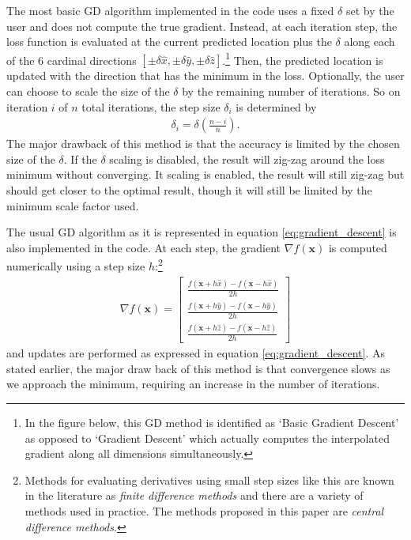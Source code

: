 \documentclass[11pt, letterpaper]{extarticle} %
\begin{document}
The most basic GD algorithm implemented in the code uses a fixed $\delta$ set by the user and does not compute the true gradient. Instead, at each iteration step, the loss function is evaluated at the current predicted location plus the $\delta$ along each of the 6 cardinal directions $[\pm \delta \hat{x}, \pm \delta \hat{y}, \pm \delta \hat{z}]$.\footnote{In the figure below, this GD method is identified as `Basic Gradient Descent' as opposed to `Gradient Descent' which actually computes the interpolated gradient along all dimensions simultaneously.} Then, the predicted location is updated with the direction that has the minimum in the loss. Optionally, the user can choose to scale the size of the $\delta$ by the remaining number of iterations. So on iteration $i$ of $n$ total iterations, the step size $\delta_i$ is determined by
\begin{align}
    \delta_i = \delta \left(\frac{n-i}{n} \right).    
\end{align}
The major drawback of this method is that the accuracy is limited by the chosen size of the $\delta$. If the $\delta$ scaling is disabled, the result will zig-zag around the loss minimum without converging. It scaling is enabled, the result will still zig-zag but should get closer to the optimal result, though it will still be limited by the minimum scale factor used.

The usual GD algorithm as it is represented in equation \ref{eq:gradient_descent} is also implemented in the code. At each step, the gradient $\nabla f (\mathbf{x})$ is computed numerically using a step size $h$:\footnote{Methods for evaluating derivatives using small step sizes like this are known in the literature as \textit{finite difference methods} and there are a variety of methods used in practice. The methods proposed in this paper are \textit{central difference methods}.}
\begin{align}
    \nabla f(\mathbf{x}) = 
    \begin{bmatrix}
    \frac{f (\mathbf{x} + h \hat{x}) - f(\mathbf{x} - h \hat{x})}{2 h} \\
    \frac{f (\mathbf{x} + h \hat{y}) - f(\mathbf{x} - h \hat{y})}{2 h} \\
    \frac{f (\mathbf{x} + h \hat{z}) - f(\mathbf{x} - h \hat{z})}{2 h}
    \end{bmatrix}
\end{align}
and updates are performed as expressed in equation \ref{eq:gradient_descent}. As stated earlier, the major draw back of this method is that convergence slows as we approach the minimum, requiring an increase in the number of iterations.
\end{document}
